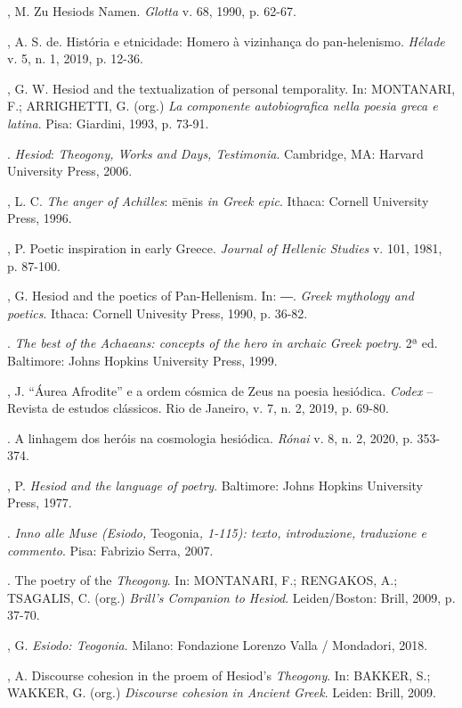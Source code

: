 \begin{bibliohedra}
, M. Zu Hesiods Namen. \emph{Glotta} v. 68, 1990, p. 62-67.

, A. S. de. História e etnicidade: Homero à vizinhança do
pan-helenismo. \emph{Hélade} v. 5, n. 1, 2019, p. 12-36.

, G. W. Hesiod and the textualization of personal temporality. In:
MONTANARI, F.; ARRIGHETTI, G. (org.) \emph{La componente autobiografica
nella poesia greca e latina}. Pisa: Giardini, 1993, p. 73-91.

\titidem. \emph{Hesiod}: \emph{Theogony, Works and Days, Testimonia}.
Cambridge, MA: Harvard University Press, 2006.

, L. C. \emph{The anger of Achilles}: mēnis \emph{in Greek
epic}. Ithaca: Cornell University Press, 1996.

, P. Poetic inspiration in early Greece. \emph{Journal of Hellenic
Studies} v. 101, 1981, p. 87-100.

, G. Hesiod and the poetics of Pan-Hellenism. In: ―. \emph{Greek
mythology and poetics}. Ithaca: Cornell Univesity Press, 1990, p. 36-82.

\titidem. \emph{The best of the Achaeans: concepts of the hero in archaic Greek
poetry}. 2ª ed. Baltimore: Johns Hopkins University Press, 1999.

, J. ``Áurea Afrodite'' e a ordem cósmica de Zeus na poesia
hesiódica. \emph{Codex} -- Revista de estudos clássicos. Rio de Janeiro,
v. 7, n. 2, 2019, p. 69-80.

\titidem. A linhagem dos heróis na cosmologia hesiódica. \emph{Rónai} v. 8, n.
2, 2020, p. 353-374.

, P. \emph{Hesiod and the language of poetry}. Baltimore: Johns
Hopkins University Press, 1977.

\titidem. \emph{Inno alle Muse (Esiodo,} Teogonia\emph{, 1-115): texto,
introduzione, traduzione e commento}. Pisa: Fabrizio Serra, 2007.

\titidem. The poetry of the \emph{Theogony}. In: MONTANARI, F.; RENGAKOS, A.;
TSAGALIS, C. (org.) \emph{Brill's Companion to Hesiod}. Leiden/Boston:
Brill, 2009, p. 37-70.

, G. \emph{Esiodo: Teogonia}. Milano: Fondazione Lorenzo
Valla / Mondadori, 2018.

, A. Discourse cohesion in the proem of Hesiod's
\emph{Theogony}. In: BAKKER, S.; WAKKER, G. (org.) \emph{Discourse
cohesion in Ancient Greek}. Leiden: Brill, 2009.


\end{bibliohedra}
